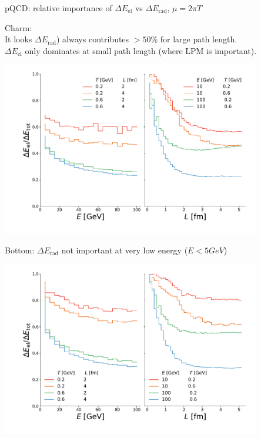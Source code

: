\documentclass[11pt]{beamer}
\begin{document}
\begin{frame}{pQCD: relative importance of $\Delta E_{\textrm{el}}$ vs $\Delta E_{\textrm{rad}}$, $\mu = 2\pi T$}
\begin{overprint}
Charm: \\
It looks $\Delta E_{\textrm{rad}}$) always contributes $>50\%$ for large path length.\\
$\Delta E_{\textrm{el}}$ only dominates at small path length (where LPM is important).
\begin{center}
\includegraphics[width=0.85\textwidth]{fig/charm-plot/el_vs_inel.pdf}
\end{center}
Bottom: $\Delta E_{\textrm{rad}}$ not important at very low energy ($E<5 GeV$)
\begin{center}
\includegraphics[width=0.85\textwidth]{fig/bottom-plot/el_vs_inel.pdf}
\end{center}
\end{overprint}
\end{frame}
\end{document}
